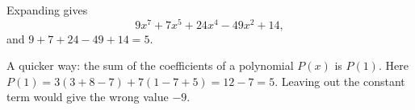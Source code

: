 Expanding gives
\[9x^7+7x^5+24x^4-49x^2+14,\]
and $9+7+24-49+14=\boxed{5}$.

A quicker way: the sum of the coefficients of a polynomial $P(x)$ is $P(1)$. Here $P(1)=3(3+8-7)+7(1-7+5)=12-7=5$. Leaving out the constant term would give the wrong value $-9$.
